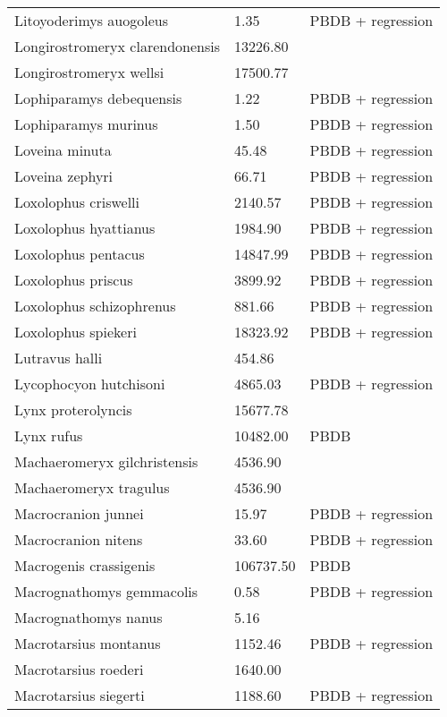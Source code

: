 \documentclass{article}
\begin{document}
\begin{center}
\begin{longtable}{p{} p{} p{}}
    Litoyoderimys auogoleus & 1.35 & PBDB + regression \\ 
    Longirostromeryx clarendonensis & 13226.80 & \cite{Tomiya2013} \\ 
    Longirostromeryx wellsi & 17500.77 & \cite{Tomiya2013} \\ 
    Lophiparamys debequensis & 1.22 & PBDB + regression \\ 
    Lophiparamys murinus & 1.50 & PBDB + regression \\ 
    Loveina minuta & 45.48 & PBDB + regression \\ 
    Loveina zephyri & 66.71 & PBDB + regression \\ 
    Loxolophus criswelli & 2140.57 & PBDB + regression \\ 
    Loxolophus hyattianus & 1984.90 & PBDB + regression \\ 
    Loxolophus pentacus & 14847.99 & PBDB + regression \\ 
    Loxolophus priscus & 3899.92 & PBDB + regression \\ 
    Loxolophus schizophrenus & 881.66 & PBDB + regression \\ 
    Loxolophus spiekeri & 18323.92 & PBDB + regression \\ 
    Lutravus halli & 454.86 & \cite{Tomiya2013} \\ 
    Lycophocyon hutchisoni & 4865.03 & PBDB + regression \\ 
    Lynx proterolyncis & 15677.78 & \cite{Tomiya2013} \\ 
    Lynx rufus & 10482.00 & PBDB \\ 
    Machaeromeryx gilchristensis & 4536.90 & \cite{Tomiya2013} \\ 
    Machaeromeryx tragulus & 4536.90 & \cite{Tomiya2013} \\ 
    Macrocranion junnei & 15.97 & PBDB + regression \\ 
    Macrocranion nitens & 33.60 & PBDB + regression \\ 
    Macrogenis crassigenis & 106737.50 & PBDB \\ 
    Macrognathomys gemmacolis & 0.58 & PBDB + regression \\ 
    Macrognathomys nanus & 5.16 & \cite{Tomiya2013} \\ 
    Macrotarsius montanus & 1152.46 & PBDB + regression \\ 
    Macrotarsius roederi & 1640.00 & \cite{Soligo2006} \\ 
    Macrotarsius siegerti & 1188.60 & PBDB + regression \\ 

\end{longtable}
\end{center}
\end{document}
